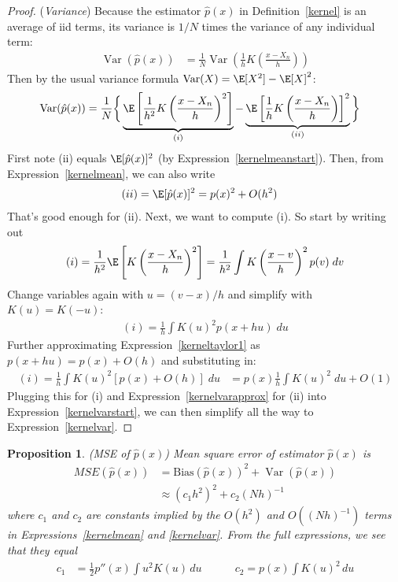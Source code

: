 \documentclass[12pt]{article}
\theoremstyle{plain}
\newtheorem{prop}[thm]{Proposition}
\theoremstyle{definition}
\theoremstyle{remark}
\newcommand{\Var}{\operatorname{Var}}
\begin{document}
\begin{proof}
(\emph{Variance})
Because the estimator $\hat{p}(x)$ in Definition~\ref{kernel} is an
average of iid terms, its variance is $1/N$ times the variance of any
individual term:
\begin{align*}
  \Var(\hat{p}(x))
  &=
  \frac{1}{N}
  \Var\left(
  \frac{1}{h}
  K\left(
  \frac{x-X_n}{h}
  \right)
  \right)
\end{align*}
Then by the usual variance formula $\Var(X)=\E[X^2]-\E[X]^2$:
\begin{align}
  \Var(\hat{p}(x))
  &=
  \frac{1}{N}
  \bigg\{
  \underbrace{%
    \E\left[
    \frac{1}{h^2}
    K\left(
    \frac{x-X_n}{h}
    \right)^2
    \right]
  }_{(i)}
  -
  \underbrace{%
    \E\left[
    \frac{1}{h}
    K\left(
    \frac{x-X_n}{h}
    \right)
    \right]^2
  }_{(ii)}
  \bigg\}
  \label{kernelvarstart}
\end{align}
First note (ii) equals $\E[\hat{p}(x)]^2$ (by
Expression~\ref{kernelmeanstart}).
Then, from Expression~\ref{kernelmean}, we can also write
\begin{align}
  (ii)
  =
  \E[\hat{p}(x)]^2
  &=
  p(x)^2 + O(h^2)
  \label{kernelvarapprox}
\end{align}
That's good enough for (ii).
Next, we want to compute (i). So start by writing out
\begin{align*}
  (i)
  =
  \frac{1}{h^2}
  \E\left[
  K\left(
  \frac{x-X_n}{h}
  \right)^2
  \right]
  =
  \frac{1}{h^2}
  \int
  K\left(
  \frac{x-v}{h}
  \right)^2
  p(v)
  \;
  dv
\end{align*}
Change variables again with $u=(v-x)/h$ and simplify with $K(u)=K(-u)$:
\begin{align*}
  (i)
  =
  \frac{1}{h}
  \int
  K\left( u \right)^2
  p(x+hu)
  \;
  du
\end{align*}
Further approximating Expression~\ref{kerneltaylor1} as
$p(x+hu) = p(x) + O(h)$ and substituting in:
\begin{align*}
  (i)
  =
  \frac{1}{h}
  \int
  K\left( u \right)^2
  \left[
  p(x)
  + O(h)
  \right]
  \;
  du
  &=
  p(x)
  \frac{1}{h}
  \int
  K\left( u \right)^2
  \;
  du
  + O(1)
\end{align*}
Plugging this for (i) and Expression~\ref{kernelvarapprox} for (ii) into
Expression~\ref{kernelvarstart}, we can then simplify all the way to
Expression~\ref{kernelvar}.
\end{proof}


\clearpage
\begin{prop}\emph{(MSE of $\hat{p}(x)$)}
Mean square error of estimator $\hat{p}(x)$ is
\begin{align*}
  MSE(\hat{p}(x))
  &=
  \text{Bias}(\hat{p}(x))^2
  + \Var(\hat{p}(x))
  \\
  &\approx
  (c_1 h^2)^2
  +
  c_2 (Nh)^{-1}
\end{align*}
where $c_1$ and $c_2$ are constants implied by the $O(h^2)$
and $O((Nh)^{-1})$ terms in Expressions~\ref{kernelmean} and
\ref{kernelvar}. From the full expressions, we see that they equal
\begin{align*}
  c_1
  &= \frac{1}{2}p''(x)\int u^2K(u)\,du
  \quad\qquad
  c_2
  = p(x)\int K(u)^2\,du
\end{align*}
\end{prop}
\end{document}
